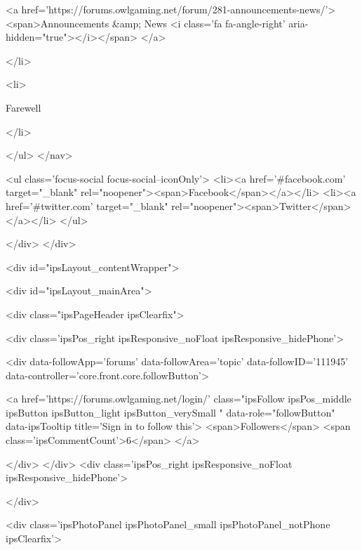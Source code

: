 					<a href='https://forums.owlgaming.net/forum/281-announcements-news/'>
						<span>Announcements &amp; News <i class='fa fa-angle-right' aria-hidden="true"></i></span>
					</a>
				
			</li>
		
			<li>
				
					Farewell
				
			</li>
		
	</ul>
</nav>
								

<ul class='focus-social focus-social--iconOnly'>
	<li><a href='#facebook.com' target="_blank" rel="noopener"><span>Facebook</span></a></li>
<li><a href='#twitter.com' target="_blank" rel="noopener"><span>Twitter</span></a></li>
</ul>

							</div>
						</div>
						






						<div id="ipsLayout_contentWrapper">
							
							<div id="ipsLayout_mainArea">
								
								
								
								
								

	




								




<div class="ipsPageHeader ipsClearfix">



	
		<div class='ipsPos_right ipsResponsive_noFloat ipsResponsive_hidePhone'>
			

<div data-followApp='forums' data-followArea='topic' data-followID='111945' data-controller='core.front.core.followButton'>
	

	<a href='https://forums.owlgaming.net/login/' class="ipsFollow ipsPos_middle ipsButton ipsButton_light ipsButton_verySmall " data-role="followButton" data-ipsTooltip title='Sign in to follow this'>
		<span>Followers</span>
		<span class='ipsCommentCount'>6</span>
	</a>

</div>
		</div>
		<div class='ipsPos_right ipsResponsive_noFloat ipsResponsive_hidePhone'>
			



		</div>
		
	
	<div class='ipsPhotoPanel ipsPhotoPanel_small ipsPhotoPanel_notPhone ipsClearfix'>
		



